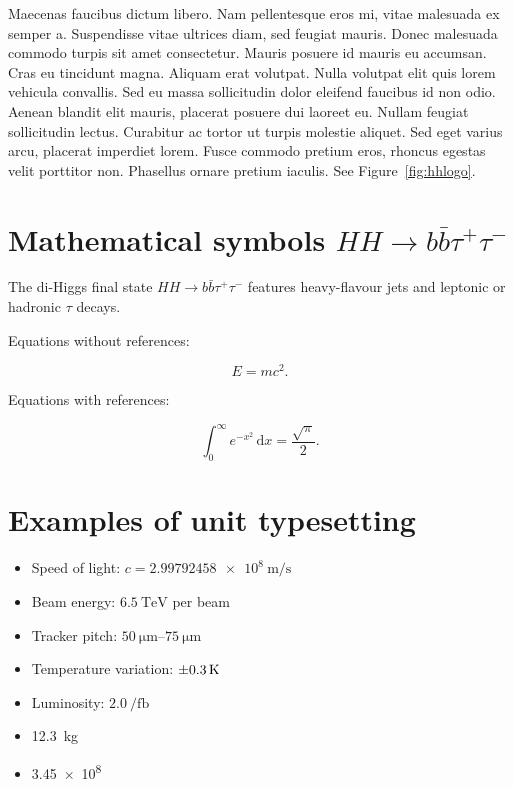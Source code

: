 
Maecenas faucibus dictum libero. Nam pellentesque eros mi, vitae malesuada ex semper a. Suspendisse vitae ultrices diam, sed feugiat mauris. Donec malesuada commodo turpis sit amet consectetur. Mauris posuere id mauris eu accumsan. Cras eu tincidunt magna. Aliquam erat volutpat. Nulla volutpat elit quis lorem vehicula convallis. Sed eu massa sollicitudin dolor eleifend faucibus id non odio. Aenean blandit elit mauris, placerat posuere dui laoreet eu. Nullam feugiat sollicitudin lectus. Curabitur ac tortor ut turpis molestie aliquet. Sed eget varius arcu, placerat imperdiet lorem. Fusce commodo pretium eros, rhoncus egestas velit porttitor non. Phasellus ornare pretium iaculis. See Figure~\ref{fig:hhlogo}.

\newpage

\section[Mathematical symbols $HH\to b\bar{b}\tau^{+}\tau^{-}$]{Mathematical symbols \boldmath ${HH\to b\bar{b}\tau^{+}\tau^{-}}$\unboldmath}

The di-Higgs final state ${HH \to b\bar{b}\tau^{+}\tau^{-}}$ features heavy-flavour jets and leptonic or hadronic ${\tau}$ decays.

Equations without references:

\begin{equation*}
E = m c^{2}\text{.}
\end{equation*}

Equations with references:

\begin{equation}
\int_{0}^{\infty} e^{-x^{2}}\,\mathrm{d}x = \frac{\sqrt{\pi}}{2}\text{.}
\end{equation}

\section{Examples of unit typesetting}

\begin{itemize}
\item Speed of light: ${c=\SI{2.99792458e8}{\metre\per\second}}$
\item Beam energy: ${\qty{6.5}{\TeV}}$ per beam
\item Tracker pitch: ${\qtyrange{50}{75}{\micro\metre}}$
\item Temperature variation: ${\qty{\pm 0.3}{\kelvin}}$
\item Luminosity: ${\qty{2.0}{\per\femto\barn}}$
\item \SI{12.3}{\kilo\gram}
\item \num{3.45e8}
\end{itemize}


